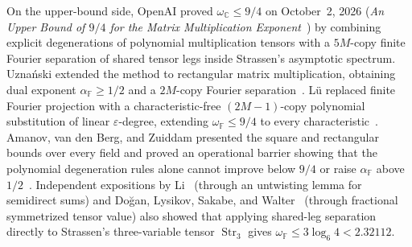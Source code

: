 \documentclass[11pt,a4paper]{article}
\theoremstyle{plain}
\theoremstyle{definition}
\theoremstyle{remark}
\newcommand{\C}{\mathbb{C}}
\newcommand{\F}{\mathbb{F}}
\DeclareMathOperator{\Str}{Str}
\begin{document}
On the upper-bound side, OpenAI proved $\omega_{\C} \le 9/4$ on October~2, 2026 (\emph{An Upper Bound of $9/4$ for the Matrix Multiplication Exponent}~\cite{OpenAI2026Upper}) by combining explicit degenerations of polynomial multiplication tensors with a $5M$-copy finite Fourier separation of shared tensor legs inside Strassen's asymptotic spectrum. Uzna\'nski extended the method to rectangular matrix multiplication, obtaining dual exponent $\alpha_{\F} \ge 1/2$ and a $2M$-copy Fourier separation~\cite{Uznanski2026}. L\"u replaced finite Fourier projection with a characteristic-free $(2M - 1)$-copy polynomial substitution of linear $\varepsilon$-degree, extending $\omega_{\F} \le 9/4$ to every characteristic~\cite{Lu2026}. Amanov, van den Berg, and Zuiddam presented the square and rectangular bounds over every field and proved an operational barrier showing that the polynomial degeneration rules alone cannot improve below $9/4$ or raise $\alpha_{\F}$ above $1/2$~\cite{Amanov2026}. Independent expositions by Li~\cite{Li2026} (through an untwisting lemma for semidirect sums) and Do\u{g}an, Lysikov, Sakabe, and Walter~\cite{Dogan2026} (through fractional symmetrized tensor value) also showed that applying shared-leg separation directly to Strassen's three-variable tensor $\Str_3$ gives $\omega_{\F} \le 3\log_6 4 < 2.32112$.
\end{document}
